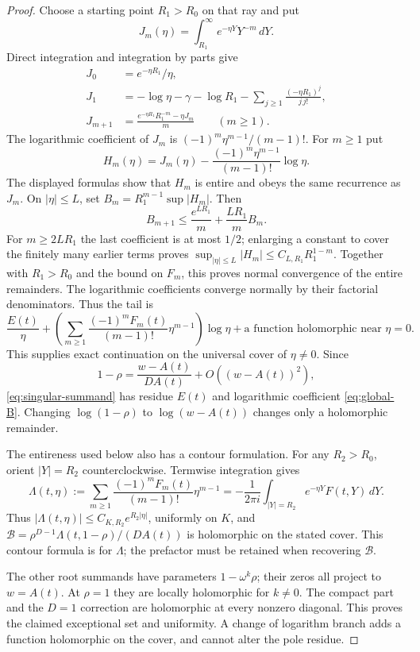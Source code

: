 \documentclass[11pt]{article}
\numberwithin{equation}{section}
\theoremstyle{definition}\newtheorem{definition}[theorem]{Definition}
\theoremstyle{remark}\newtheorem{remark}[theorem]{Remark}
\newcommand{\dd}{\,d}
\begin{document}
\begin{proof}
Choose a starting point $R_1>R_0$ on that ray and put
\[
 J_m(\eta)=\int_{R_1}^\infty e^{-\eta Y}Y^{-m}\dd Y.
\]
Direct integration and integration by parts give
\begin{align*}
 J_0&=e^{-\eta R_1}/\eta,\\
 J_1&=-\log\eta-\gamma-\log R_1-
       \sum_{j\ge1}\frac{(-\eta R_1)^j}{j\,j!},\\
 J_{m+1}&=\frac{e^{-\eta R_1}R_1^{-m}-\eta J_m}{m}\qquad(m\ge1).
\end{align*}
The logarithmic coefficient of $J_m$ is
$(-1)^m\eta^{m-1}/(m-1)!$. For $m\ge1$ put
\[
 H_m(\eta)=J_m(\eta)
 -\frac{(-1)^m\eta^{m-1}}{(m-1)!}\log\eta.
\]
The displayed formulas show that $H_m$ is entire and obeys the same
recurrence as $J_m$. On $|\eta|\le L$, set
$B_m=R_1^{m-1}\sup|H_m|$. Then
\[
 B_{m+1}\le\frac{e^{LR_1}}m+\frac{LR_1}m B_m.
\]
For $m\ge2LR_1$ the last coefficient is at most $1/2$; enlarging a
constant to cover the finitely many earlier terms proves
$\sup_{|\eta|\le L}|H_m|\le C_{L,R_1}R_1^{1-m}$.
Together with $R_1>R_0$ and the bound on $F_m$, this proves normal
convergence of the entire remainders. The logarithmic coefficients
converge normally by their factorial denominators. Thus the tail is
\[
 \frac{E(t)}\eta+
 \left(\sum_{m\ge1}\frac{(-1)^mF_m(t)}{(m-1)!}\eta^{m-1}\right)\log\eta
 +\text{a function holomorphic near }\eta=0.
\]
This supplies exact continuation on the universal cover of $\eta\ne0$.
Since
\[
 1-\rho=\frac{w-A(t)}{DA(t)}+O((w-A(t))^2),
\]
\eqref{eq:singular-summand} has residue $E(t)$ and logarithmic coefficient
\eqref{eq:global-B}. Changing $\log(1-\rho)$ to $\log(w-A(t))$ changes
only a holomorphic remainder.

The entireness used below also has a contour formulation. For any
$R_2>R_0$, orient $|Y|=R_2$ counterclockwise. Termwise integration gives
\[
 \Lambda(t,\eta):=\sum_{m\ge1}\frac{(-1)^mF_m(t)}{(m-1)!}\eta^{m-1}
 =-\frac1{2\pi i}\int_{|Y|=R_2}e^{-\eta Y}F(t,Y)\dd Y.
\]
Thus $|\Lambda(t,\eta)|\le C_{K,R_2}e^{R_2|\eta|}$, uniformly on $K$,
and $\mathscr B=\rho^{D-1}\Lambda(t,1-\rho)/(DA(t))$ is holomorphic
on the stated cover. This contour formula is for $\Lambda$; the
prefactor must be retained when recovering $\mathscr B$.

The other root summands have parameters $1-\omega^k\rho$; their zeros all
project to $w=A(t)$. At $\rho=1$ they are locally holomorphic for $k\ne0$.
The compact part and the $D=1$ correction are holomorphic at every
nonzero diagonal. This proves the claimed exceptional set and uniformity.
A change of logarithm branch adds a function holomorphic on the cover,
and cannot alter the pole residue.
\end{proof}
\end{document}
